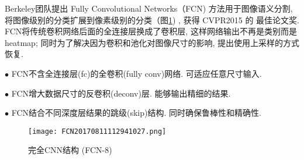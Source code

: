 Berkeley团队提出 Fully Convolutional Networks（FCN) 方法用于图像语义分割, 将图像级别的分类扩展到像素级别的分类（图\ref{FCN20170811112941027}) , 获得 CVPR2015 的 最佳论文奖\cite{Long2015-9593}.
FCN将传统卷积网络后面的全连接层换成了卷积层, 这样网络输出不再是类别而是 heatmap; 同时为了解决因为卷积和池化对图像尺寸的影响, 提出使用上采样的方式恢复.

$\bullet$ FCN不含全连接层(fc)的全卷积(fully conv)网络. 可适应任意尺寸输入.

$\bullet$ FCN增大数据尺寸的反卷积(deconv)层. 能够输出精细的结果.

$\bullet$ FCN结合不同深度层结果的跳级(skip)结构. 同时确保鲁棒性和精确性.
\begin{figure}[H]
    \centering
    \texttt{[image: FCN20170811112941027.png]}
    \caption{完全CNN结构 (FCN-8)\cite{}}
    \label{FCN20170811112941027}
    \vspace{-0.4cm}
\end{figure}

